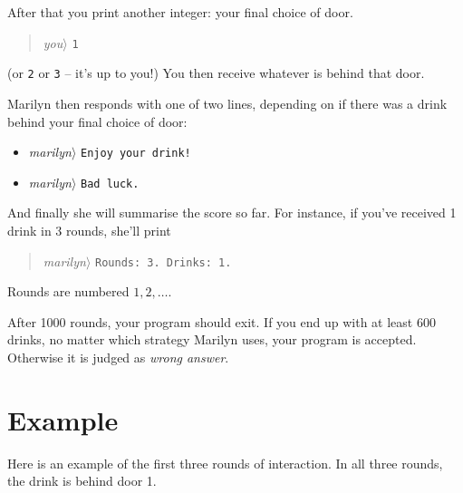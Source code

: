 After that you print another integer: your final choice of door.
\begin{quote}\emph{you}$\rangle$ \verb}1}\end{quote}
  (or \verb}2} or \verb}3} -- it's up to you!)
You then receive whatever is behind that door.

Marilyn then responds with one of two lines, depending on if there was a drink behind your final choice of door:
\begin{itemize}
\item \emph{marilyn}$\rangle$ \verb}Enjoy your drink!}
\item \emph{marilyn}$\rangle$ \verb}Bad luck.}
\end{itemize}
And finally she will summarise the score so far.
For instance, if you’ve received 1 drink in 3 rounds, she’ll print
\begin{quote}\emph{marilyn}$\rangle$ \verb}Rounds: 3. Drinks: 1.}\end{quote}
Rounds are numbered $1, 2, \ldots$.

After 1000 rounds, your program should exit.
If you end up with at least 600 drinks, no matter which strategy Marilyn uses, your program is accepted.
Otherwise it is judged as \emph{wrong answer}.


\section*{Example}

Here is an example of the first three rounds of interaction.
In all three rounds, the drink is behind door 1.


